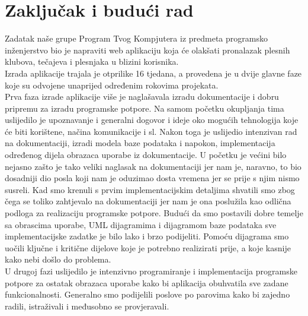 \chapter{Zaključak i budući rad}
		
		 \noindent Zadatak naše grupe Program Tvog Kompjutera iz predmeta programsko inženjerstvo bio je napraviti web aplikaciju koja će 
		olakšati pronalazak plesnih klubova, tečajeva i plesnjaka u blizini korisnika.\\
		\noindent Izrada aplikacije trajala je otprilike 16 tjedana, a provedena je u dvije glavne faze koje su odvojene 
		unaprijed određenim rokovima projekata.\\
		\noindent Prva faza izrade aplikacije više je naglašavala izradu dokumentacije i dobru pripremu za izradu programske potpore. 
		Na samom početku okupljanja tima uslijedilo je upoznavanje i generalni dogovor i ideje oko mogućih tehnologija koje će biti korištene, načina komunikacije i sl.
		Nakon toga je uslijedio intenzivan rad na dokumentaciji, izradi modela baze podataka i napokon, implementacija određenog dijela obrazaca uporabe iz 
		dokumentacije. U početku je većini bilo nejasno zašto je tako veliki naglasak na dokumentaciji jer nam je, naravno, to bio dosadniji dio posla 
		koji nam je oduzimao dosta vremena jer se prije s njim nismo susreli. Kad smo krenuli s prvim implementacijskim detaljima shvatili smo zbog 
		čega se toliko zahtjevalo na dokumentaciji jer nam je ona poslužila kao odlična podloga za realizaciju programske potpore. Budući da smo 
		postavili dobre temelje sa obrascima uporabe, UML dijagramima i dijagramom baze podataka sve implementacijske zadatke je bilo lako i brzo 
		podijeliti. Pomoću dijagrama smo uočili ključne i kritične dijelove koje je potrebno realizirati prije, a koje kasnije kako nebi došlo do 
		problema.\\
		\noindent U drugoj fazi uslijedilo je intenzivno programiranje i implementacija programske potpore za ostatak obrazaca uporabe kako bi aplikacija 
		obuhvatila sve zadane funkcionalnosti. Generalno smo podijelili poslove po parovima kako bi zajedno radili, istraživali i međusobno se provjeravali. 
